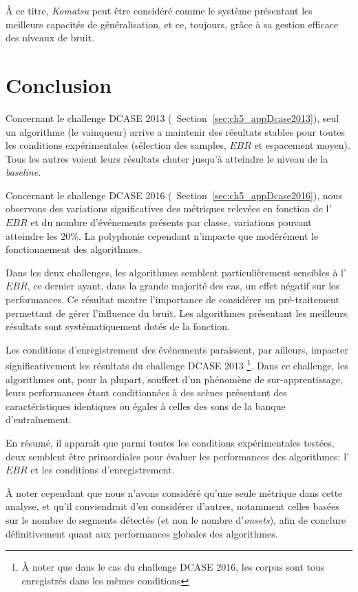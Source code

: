 À ce titre, \emph{Komatsu} peut être considéré comme le système présentant les meilleurs capacités de généralisation, et ce, toujours, grâce à sa gestion efficace des niveaux de bruit.

\section{Conclusion}

Concernant le challenge DCASE 2013 (\cf~Section~\ref{sec:ch5_appDcase2013}), seul un algorithme (le vainqueur) arrive a maintenir des résultats stables pour toutes les conditions expérimentales (sélection des samples, $EBR$ et espacement moyen). Tous les autres voient leurs résultats chuter jusqu'à atteindre le niveau de la \emph{baseline}.

Concernant le challenge DCASE 2016 (\cf~Section~\ref{sec:ch5_appDcase2016}), nous observons des variations significatives des métriques relevées en fonction de l'$EBR$ et du nombre d'événements présents par classe, variations pouvant atteindre les $20\%$. La polyphonie cependant n’impacte que modérément le fonctionnement des algorithmes.

Dans les deux challenges, les algorithmes semblent particulièrement sensibles à l'$EBR$, ce dernier ayant, dans la grande majorité des cas, un effet négatif sur les performances. Ce résultat montre l'importance de considérer un pré-traitement permettant de gérer l'influence du bruit. Les algorithmes présentant les meilleurs résultats sont systématiquement dotés de la fonction.

Les conditions d'enregistrement des événements paraissent, par ailleurs, impacter significativement les résultats du challenge DCASE 2013 \footnote{À noter que dans le cas du challenge DCASE 2016, les corpus sont tous enregistrés dans les mêmes conditions}. Dans ce challenge, les algorithmes ont, pour la plupart, souffert d'un phénomène de sur-apprentissage, leurs performances étant conditionnées à des scènes présentant des caractéristiques identiques ou égales à celles des sons de la banque d’entraînement.

En résumé, il apparaît que parmi toutes les conditions expérimentales testées, deux semblent être primordiales pour évaluer
les performances des algorithmes: l'$EBR$ et les conditions d'enregistrement.

À noter cependant que nous n'avons considéré qu'une seule métrique dans cette analyse, et qu'il conviendrait d'en considérer d'autres, notamment celles basées sur le nombre de segments détectés (et non le nombre d'\emph{onsets}), afin de conclure définitivement quant aux performances globales des algorithmes.

